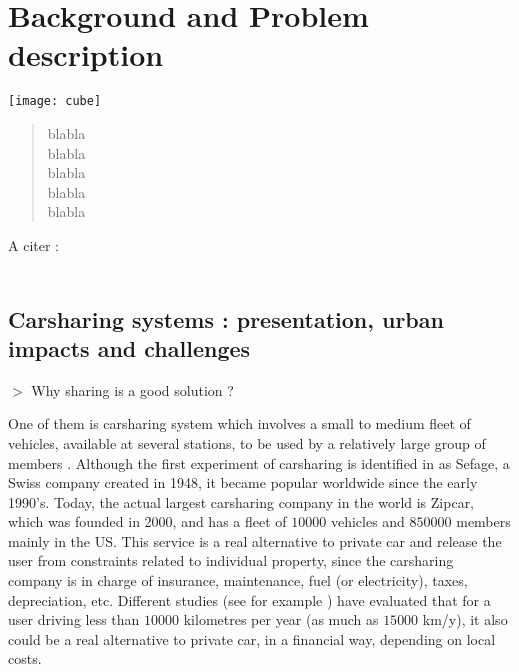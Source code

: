 \chapter{Background and Problem description} \label{chap:backAndPb}
\begin{bibunit}[ieeetr]
\minitoc
\vspace{2cm}

\begin{minipage}[c]{0.45\linewidth}
\texttt{[image: cube]}
\end{minipage}
\hfill
\begin{minipage}[c]{0.45\linewidth}
\begin{abstract}
blabla\\
blabla\\
blabla\\
blabla\\
blabla\\
\end{abstract}
\end{minipage}

\newpage
A citer :\\
\cite{leclerc_unraveling_2013}\\
\cite{louvet_enquete_2013}


\section{Carsharing systems : presentation, urban impacts and challenges}
$>$ Why sharing is a good solution ?

One of them is carsharing system which involves a small to medium fleet of vehicles, available at several stations, to be used by a relatively large group of members \cite{shaheen_short_1999}.
Although the first experiment of carsharing is identified in \cite{shaheen_short_1999} as Sefage, a Swiss company created in 1948, it became popular worldwide since the early 1990's.
Today, the actual largest carsharing company in the world is Zipcar, which was founded in 2000, and has a fleet of $10 000$ vehicles and $850 000$ members mainly in the US. %
This service is a real alternative to private car and release the user from constraints related to individual property, since the carsharing company is in charge of insurance, maintenance, fuel (or electricity), taxes, depreciation, etc.
Different studies (see for example \cite{litman_evaluating_2000, prettenthaler_ownership_1999}) have evaluated that for a user driving less than $10 000$ kilometres per year (as much as $15 000$ km/y), it also could be a real alternative to private car, in a financial way, depending on local costs.


\end{bibunit}
